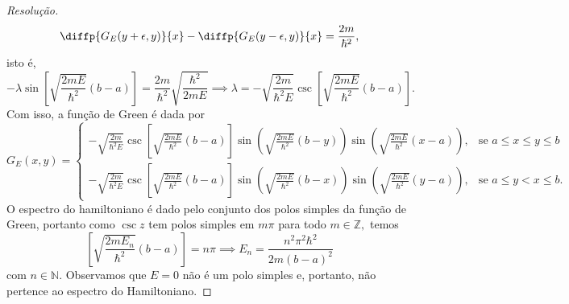 \begin{proof}[Resolução]
   \begin{equation*}
      \diffp{G_E(y + \epsilon, y)}{x} - \diffp{G_E(y - \epsilon, y)}{x} = \frac{2m}{\hbar^2},
   \end{equation*}
   isto é,
   \begin{equation*}
      -\lambda  \sin\left[\sqrt{\frac{2mE}{\hbar^2}} (b - a)\right] = \frac{2m}{\hbar^2} \sqrt{\frac{\hbar^2}{2m E}} \implies \lambda = -\sqrt{\frac{2m}{\hbar^2 E}} \csc\left[\sqrt{\frac{2mE}{\hbar^2}} (b - a)\right].
   \end{equation*}
   Com isso, a função de Green é dada por
   \begin{equation*}
      G_{E}(x,y) = \begin{cases}
         - \sqrt{\frac{2m}{\hbar^2 E}}\csc\left[\sqrt{\frac{2mE}{\hbar^2}} (b - a)\right]\sin\left(\sqrt{\frac{2mE}{\hbar^2}} (b-y)\right)\sin\left(\sqrt{\frac{2mE}{\hbar^2}} (x-a)\right),&\text{se }a \leq x \leq y \leq b\\
         - \sqrt{\frac{2m}{\hbar^2 E}}\csc\left[\sqrt{\frac{2mE}{\hbar^2}} (b - a)\right]\sin\left(\sqrt{\frac{2mE}{\hbar^2}} (b-x)\right)\sin\left(\sqrt{\frac{2mE}{\hbar^2}} (y-a)\right),&\text{se } a \leq y < x \leq b.
      \end{cases}
   \end{equation*}
   O espectro do hamiltoniano é dado pelo conjunto dos polos simples da função de Green, portanto como \(\csc z\) tem polos simples em \(m \pi\) para todo \(m \in \mathbb{Z},\) temos
   \begin{equation*}
      \left[\sqrt{\frac{2mE_n}{\hbar^2}} (b - a)\right] = n\pi \implies E_n = \frac{n^2 \pi^2 \hbar^2}{2m(b - a)^2}
   \end{equation*}
   com \(n \in \mathbb{N}\). Observamos que \(E = 0\) não é um polo simples e, portanto, não pertence ao espectro do Hamiltoniano.


\end{proof}
